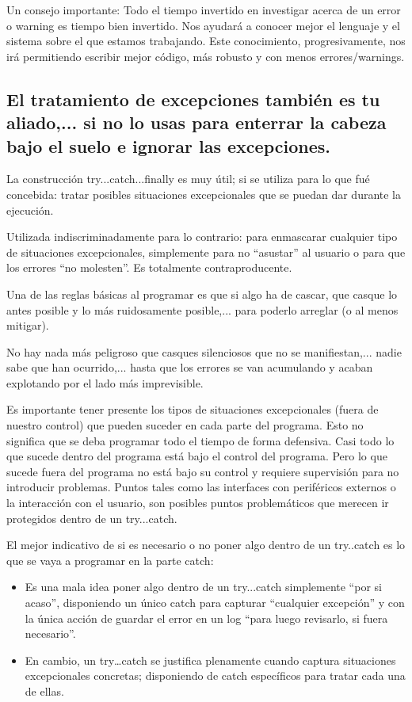 \documentclass[spanish,12pt,a4paper,final,oneside]{book}
\begin{document}
Un consejo importante: Todo el tiempo invertido en investigar acerca de un error o warning es tiempo bien invertido. Nos ayudará a conocer mejor el lenguaje y el sistema sobre el que estamos trabajando. Este conocimiento, progresivamente, nos irá permitiendo escribir mejor código, más robusto y con menos errores/warnings.

\subsection{El tratamiento de excepciones también es tu aliado,... si no lo usas para enterrar la cabeza bajo el suelo e ignorar las excepciones.}
La construcción try...catch...finally es muy útil; si se utiliza para lo que fué concebida: tratar posibles situaciones excepcionales que se puedan dar durante la ejecución. 

Utilizada indiscriminadamente para lo contrario: para enmascarar cualquier tipo de situaciones excepcionales, simplemente para no ``asustar'' al usuario o para que los errores ``no molesten''. Es totalmente contraproducente. 

Una de las reglas básicas al programar es que si algo ha de cascar, que casque lo antes posible y lo más ruidosamente posible,... para poderlo arreglar (o al menos mitigar). 

No hay nada más peligroso que casques silenciosos que no se manifiestan,... nadie sabe que han ocurrido,... hasta que los errores se van acumulando y acaban explotando por el lado más imprevisible.


Es importante tener presente los tipos de situaciones excepcionales (fuera de nuestro control) que pueden suceder en cada parte del programa. Esto no significa que se deba programar todo el tiempo de forma defensiva. Casi todo lo que sucede dentro del programa está bajo el control del programa. Pero lo que sucede fuera del programa no está bajo su control y requiere supervisión para no introducir problemas. Puntos  tales como las interfaces con periféricos externos o la interacción con el usuario, son posibles puntos problemáticos que merecen ir protegidos dentro de un try...catch. 

El mejor indicativo de si es necesario o no poner algo dentro de un try..catch es lo que se vaya a programar en la parte catch:
\begin{itemize}
\item Es una mala idea poner algo dentro de un try...catch simplemente ``por si acaso'', disponiendo un único catch para capturar ``cualquier excepción'' y con la única acción de guardar el error en un log ``para luego revisarlo, si fuera necesario''. 
\item En cambio, un try…catch se justifica plenamente cuando captura situaciones excepcionales concretas; disponiendo de catch específicos para tratar cada una de ellas.
\end{itemize}
\end{document}
